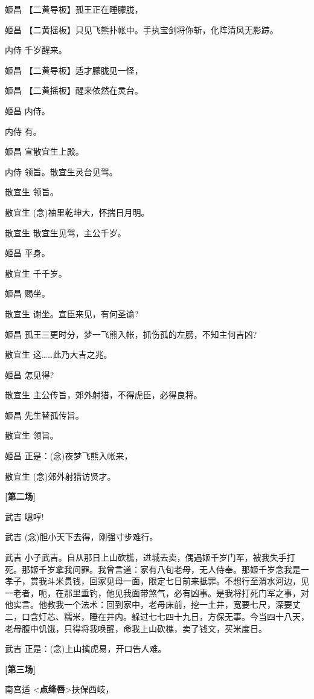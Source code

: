 姬昌 【二黄导板】孤王正在睡朦胧，

姬昌 【二黄摇板】只见飞熊扑帐中。手执宝剑将你斩，化阵清风无影踪。

内侍 千岁醒来。

姬昌 【二黄导板】适才朦胧见一怪，

姬昌 【二黄摇板】醒来依然在灵台。

姬昌 内侍。

内侍 有。

姬昌 宣散宜生上殿。

内侍 领旨。散宜生灵台见驾。

散宜生 领旨。

散宜生 (念)袖里乾坤大，怀揣日月明。

散宜生 散宜生见驾，主公千岁。

姬昌 平身。

散宜生 千千岁。

姬昌 赐坐。

散宜生 谢坐。宣臣来见，有何圣谕?

姬昌 孤王三更时分，梦一飞熊入帐，抓伤孤的左膀，不知主何吉凶?

散宜生 这\ldots{}\ldots{}此乃大吉之兆。

姬昌 怎见得?

散宜生 主公传旨，郊外射猎，不得虎臣，必得良将。

姬昌 先生替孤传旨。

散宜生 领旨。

姬昌 正是：(念)夜梦飞熊入帐来，

散宜生 (念)郊外射猎访贤才。

\textbf{{[}第二场{]}}

武吉 嗯哼!

武吉 (念)胆小天下去得，刚强寸步难行。

武吉
小子武吉。自从那日上山砍樵，进城去卖，偶遇姬千岁门军，被我失手打死。那姬千岁拿我问罪。我曾言道：家有八旬老母，无人侍奉。那姬千岁念我是一孝子，赏我斗米贯钱，回家见母一面，限定七日前来抵罪。不想行至渭水河边，见一老者，呃，在那里垂钓，他见我面带煞气，必有凶事。是我将打死门军之事，对他实言。他教我一个法术：回到家中，老母床前，挖一土井，宽要七尺，深要丈二，口含灯芯、糯米，睡在井内。躲过七七四十九日，方保无事。今当四十八天，老母腹中饥饿，只得将我唤醒，命我上山砍樵，卖了钱文，买米度日。

武吉 正是：(念)上山擒虎易，开口告人难。

\textbf{{[}第三场{]}}

南宫适 \textless{}\textbf{点绛唇}\textgreater{}扶保西岐，

